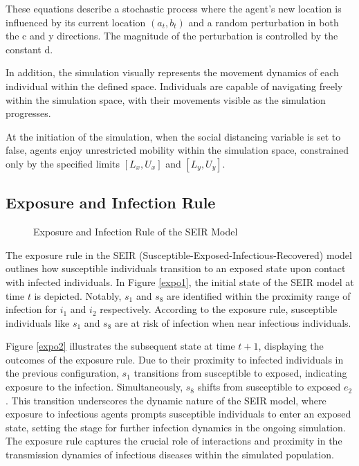 These equations describe a stochastic process where the agent's new location is influenced by its current location $(a_t, b_t)$ and a random perturbation in both the c and y directions. The magnitude of the perturbation is controlled by the constant d.

In addition, the simulation visually represents the movement dynamics of each individual within the defined space. Individuals are capable of navigating freely within the simulation space, with their movements visible as the simulation progresses.

At the initiation of the simulation, when the social distancing variable is set to false, agents enjoy unrestricted mobility within the simulation space, constrained only by the specified limits $[L_x, U_x]$ and $[L_y, U_y]$.

\subsection{Exposure and Infection Rule}
\label{rules}
\begin{figure}[H]
	\centering
	\quad
	\caption{Exposure and Infection Rule of the SEIR Model}
\end{figure}

The exposure rule in the SEIR (Susceptible-Exposed-Infectious-Recovered) model outlines how susceptible individuals transition to an exposed state upon contact with infected individuals. In Figure \ref{expo1}, the initial state of the SEIR model at time \(t\) is depicted. Notably, \(s_1\) and \(s_8\) are identified within the proximity range of infection for \(i_1\) and \(i_2\) respectively. According to the exposure rule, susceptible individuals like \(s_1\) and \(s_8\) are at risk of infection when near infectious individuals.


Figure \ref{expo2} illustrates the subsequent state at time \(t+1\), displaying the outcomes of the exposure rule. Due to their proximity to infected individuals in the previous configuration, \(s_1\) transitions from susceptible to exposed, indicating exposure to the infection. Simultaneously, \(s_8\) shifts from susceptible to exposed \(e_2\). This transition underscores the dynamic nature of the SEIR model, where exposure to infectious agents prompts susceptible individuals to enter an exposed state, setting the stage for further infection dynamics in the ongoing simulation. The exposure rule captures the crucial role of interactions and proximity in the transmission dynamics of infectious diseases within the simulated population.\\






